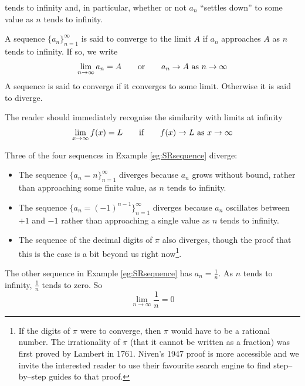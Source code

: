 tends to infinity and, in particular, whether or not $a_n$ ``settles down''
to some value as $n$ tends to infinity.
\begin{defn}\label{def:SRsequenceLimit}
A sequence $\big\{a_n\big\}_{n=1}^\infty$ is said to converge to the limit
$A$ if $a_n$ approaches $A$ as $n$ tends to infinity. If so, we write
\begin{equation*}
\lim_{n\rightarrow\infty} a_n=A\qquad\hbox{or}\qquad
a_n\rightarrow A\text{ as }n\rightarrow\infty
\end{equation*}
A sequence is said to converge if it converges to some limit. Otherwise
it is said to diverge.
\end{defn}
The reader should immediately recognise the similarity with limits at infinity
\begin{align*}
  \lim_{x \to \infty} f(x) = L \qquad\hbox{if}\qquad
    f(x) \to L \text{ as } x \to \infty
\end{align*}


\begin{eg}\label{eg:SRsequenceLimA}
Three of the four sequences in Example \ref{eg:SRsequence} diverge:
\begin{itemize}\itemsep1pt \parskip0pt  %
\item The sequence $\big\{a_n=n\big\}_{n=1}^\infty$ diverges because
$a_n$ grows without bound, rather than approaching some finite value,
as $n$ tends to infinity.
\item The sequence $\big\{a_n=(-1)^{n-1}\big\}_{n=1}^\infty$ diverges because $a_n$ oscillates between $+1$ and $-1$
rather than approaching a single value as $n$ tends to infinity.
\item The sequence of the decimal digits of $\pi$ also diverges, though the proof that this is the case is a
bit beyond us right now\footnote{If the digits of $\pi$ were to converge,
then $\pi$ would have to be a rational number. The irrationality of $\pi$
(that it cannot be written as a fraction) was first proved by Lambert in 1761.
Niven's 1947 proof is more accessible and we invite the interested reader
to use their favourite search engine to find step--by--step guides
to that proof.}.
\end{itemize}
The other sequence in Example \ref{eg:SRsequence} has $a_n=\frac{1}{n}$. As $n$ tends to infinity, $\frac{1}{n}$ tends
to zero. So
\begin{equation*}
\lim_{n\rightarrow\infty} \frac{1}{n}=0
\end{equation*}
\end{eg}


